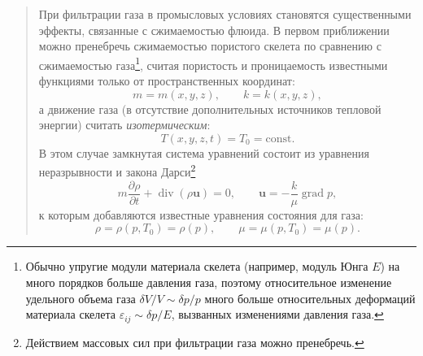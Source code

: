 \documentclass[12pt,a4paper]{article}
\DeclareMathOperator{\grad}{grad}
\DeclareMathOperator{\Div}{div}
\begin{document}
\begin{quote}\sloppy
При фильтрации газа в промысловых условиях становятся существенными эффекты, связанные с сжимаемостью флюида. В первом приближении можно пренебречь сжимаемостью пористого скелета по сравнению с сжимаемостью газа\footnote{Обычно упругие модули материала скелета (например, модуль Юнга $E$) на много порядков больше давления газа, поэтому относительное изменение удельного объема газа $\delta V/V\sim\delta p/p$ много больше относительных деформаций материала скелета $\varepsilon_{ij}\sim\delta p/E$, вызванных изменениями давления газа.}, считая пористость и проницаемость известными функциями только от пространственных координат:
\[m=m(x,y,z),\qquad k=k(x,y,z),\]
а движение газа (в отсутствие дополнительных источников тепловой энергии) считать \textit{изотермическим}:
\[T(x,y,z,t)=T_0=\mathrm{const}.\]
В этом случае замкнутая система уравнений состоит из уравнения неразрывности и закона Дарси\footnote{Действием массовых сил при фильтрации газа можно пренебречь.}
\[m\frac{\partial\rho}{\partial t}+\Div(\rho\boldsymbol{u})=0,\qquad\boldsymbol{u}=-\frac{k}{\mu}\grad p,\]
к которым добавляются известные уравнения состояния для газа:
\[\rho=\rho(p,T_0)=\rho(p),\qquad\mu=\mu(p,T_0)=\mu(p).\]
\par\nobreak{}\par
\end{quote}
\end{document}
